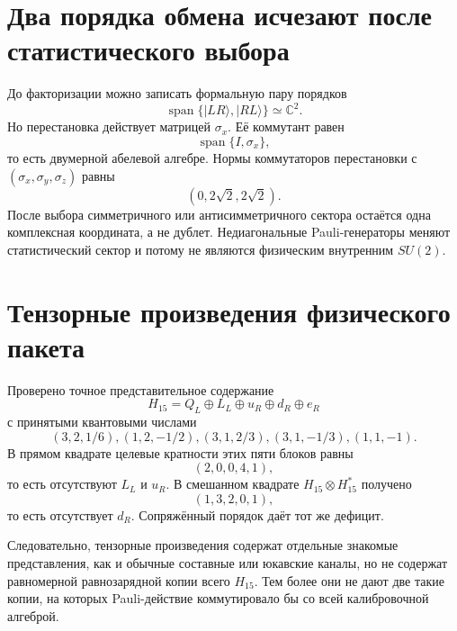 \section{Два порядка обмена исчезают после статистического выбора}

До факторизации можно записать формальную пару порядков
\begin{equation}
 \operatorname{span}\{|LR\rangle,|RL\rangle\}\simeq\mathbb C^2.
\end{equation}
Но перестановка действует матрицей $\sigma_x$. Её коммутант равен
\begin{equation}
 \operatorname{span}\{I,\sigma_x\},
\end{equation}
то есть двумерной абелевой алгебре. Нормы коммутаторов перестановки с
$(\sigma_x,\sigma_y,\sigma_z)$ равны
\begin{equation}
 (0,2\sqrt2,2\sqrt2).
\end{equation}
После выбора симметричного или антисимметричного сектора остаётся одна
комплексная координата, а не дублет. Недиагональные Pauli-генераторы
меняют статистический сектор и потому не являются физическим внутренним
$SU(2)$.

\section{Тензорные произведения физического пакета}

Проверено точное представительное содержание
\begin{equation}
 H_{15}=Q_L\oplus L_L\oplus u_R\oplus d_R\oplus e_R
\end{equation}
с принятыми квантовыми числами
\begin{equation}
 (3,2,1/6),(1,2,-1/2),(3,1,2/3),(3,1,-1/3),(1,1,-1).
\end{equation}
В прямом квадрате целевые кратности этих пяти блоков равны
\begin{equation}
 (2,0,0,4,1),
\end{equation}
то есть отсутствуют $L_L$ и $u_R$. В смешанном квадрате
$H_{15}\otimes H_{15}^*$ получено
\begin{equation}
 (1,3,2,0,1),
\end{equation}
то есть отсутствует $d_R$. Сопряжённый порядок даёт тот же дефицит.

Следовательно, тензорные произведения содержат отдельные знакомые
представления, как и обычные составные или юкавские каналы, но не
содержат равномерной равнозарядной копии всего $H_{15}$. Тем более они не
дают две такие копии, на которых Pauli-действие коммутировало бы со всей
калибровочной алгеброй.


